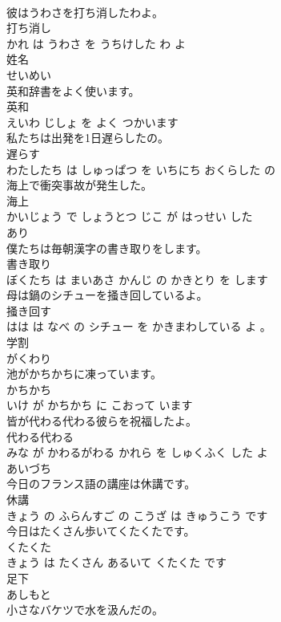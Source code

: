 \documentclass[8pt]{extreport}
\begin{document}
\begin{CJK}{UTF8}{min}
\\	彼はうわさを打ち消したわよ。	
\\	打ち消し 
\\	かれ は うわさ を うちけした わ よ			
\\	姓名	
\\	せいめい			
\\	英和辞書をよく使います。	
\\	英和 
\\	えいわ じしょ を よく つかいます			
\\	私たちは出発を1日遅らしたの。	
\\	遅らす 
\\	わたしたち は しゅっぱつ を いちにち おくらした の			
\\	海上で衝突事故が発生した。	
\\	海上 
\\	かいじょう で しょうとつ じこ が はっせい した			
\\	あり	
\\	僕たちは毎朝漢字の書き取りをします。	
\\	書き取り 
\\	ぼくたち は まいあさ かんじ の かきとり を します			
\\	母は鍋のシチューを掻き回しているよ。	
\\	掻き回す 
\\	はは は なべ の シチュー を かきまわしている よ 。			
\\	学割	
\\	がくわり			
\\	池がかちかちに凍っています。	
\\	かちかち 
\\	いけ が かちかち に こおって います			
\\	皆が代わる代わる彼らを祝福したよ。	
\\	代わる代わる 
\\	みな が かわるがわる かれら を しゅくふく した よ			
\\	あいづち	
\\	今日のフランス語の講座は休講です。	
\\	休講 
\\	きょう の ふらんすご の こうざ は きゅうこう です			
\\	今日はたくさん歩いてくたくたです。	
\\	くたくた 
\\	きょう は たくさん あるいて くたくた です			
\\	足下	
\\	あしもと			
\\	小さなバケツで水を汲んだの。	

\end{CJK}
\end{document}
